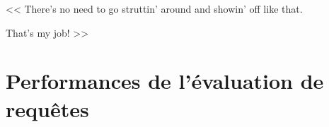 \begin{savequote}[6cm]
<< There's no need to go struttin' around and showin' off like that. 

\quad That's my job! >>
\end{savequote}

\chapter{Performances de l'évaluation de requêtes}





